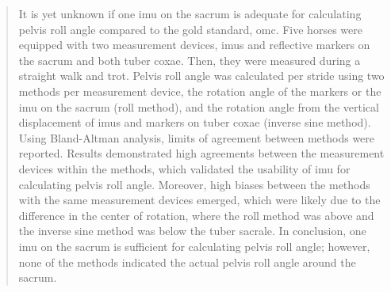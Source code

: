 \begin{quote}
    It is yet unknown if one \gls{imu} on the sacrum is adequate for calculating pelvis roll angle compared to the gold standard, \gls{omc}. Five horses were equipped with two measurement devices, \gls{imu}s and reflective markers on the sacrum and both tuber coxae. Then, they were measured during a straight walk and trot. Pelvis roll angle was calculated per stride using two methods per measurement device, the rotation angle of the markers or the \gls{imu} on the sacrum (roll method), and the rotation angle from the vertical displacement of \gls{imu}s and markers on tuber coxae (inverse sine method). Using Bland-Altman analysis, limits of agreement between methods were reported. Results demonstrated high agreements between the measurement devices within the methods, which validated the usability of \gls{imu} for calculating pelvis roll angle. Moreover, high biases between the methods with the same measurement devices emerged, which were likely due to the difference in the center of rotation, where the roll method was above and the inverse sine method was below the tuber sacrale. In conclusion, one \gls{imu} on the sacrum is sufficient for calculating pelvis roll angle; however, none of the methods indicated the actual pelvis roll angle around the sacrum.
\end{quote}

